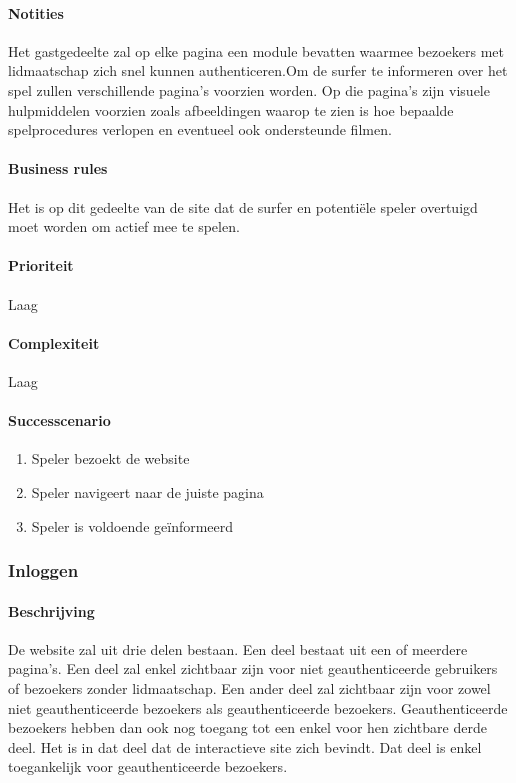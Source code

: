 \paragraph{Notities} Het gastgedeelte zal op elke pagina een module bevatten waarmee bezoekers met lidmaatschap zich snel kunnen authenticeren.\small{Om de surfer te informeren over het spel zullen verschillende pagina's voorzien worden. Op die pagina's zijn visuele hulpmiddelen voorzien zoals afbeeldingen waarop te zien is hoe bepaalde spelprocedures verlopen en eventueel ook ondersteunde filmen.}
\paragraph{Business rules}Het is op dit gedeelte van de site dat de surfer en potentiële speler overtuigd moet worden om actief mee te spelen.
\paragraph{Prioriteit}Laag
\paragraph{Complexiteit}Laag
\paragraph{Successcenario}
\begin{enumerate}
 \item Speler bezoekt de website
 \item Speler navigeert naar de juiste pagina
 \item Speler is voldoende geïnformeerd
\end{enumerate}

\subsubsection{Inloggen}
\paragraph{Beschrijving} De website zal uit drie delen bestaan. Een deel bestaat uit een of meerdere pagina's. Een deel zal enkel zichtbaar zijn voor niet geauthenticeerde gebruikers of bezoekers zonder lidmaatschap. Een ander deel zal zichtbaar zijn voor zowel niet geauthenticeerde bezoekers als geauthenticeerde bezoekers. Geauthenticeerde bezoekers hebben dan ook nog toegang tot een enkel voor hen zichtbare derde deel. Het is in dat deel dat de interactieve site zich bevindt. Dat deel is enkel toegankelijk voor geauthenticeerde bezoekers.
